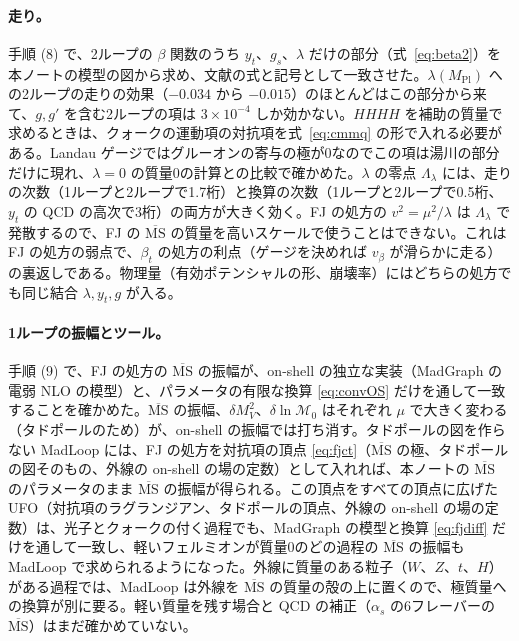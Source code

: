\documentclass[a4paper,10pt]{ltjsarticle}
\newcommand{\MSbar}{\overline{\mathrm{MS}}}
\begin{document}
\paragraph{走り。}手順 (8) で、2ループの $\beta$ 関数のうち $y_t$、$g_s$、$\lambda$ だけの部分（式~\eqref{eq:beta2}）を本ノートの模型の図から求め、文献の式と記号として一致させた。$\lambda(M_{\mathrm{Pl}})$ への2ループの走りの効果（$-0.034$ から $-0.015$）のほとんどはこの部分から来て、$g,g'$ を含む2ループの項は $3\times10^{-4}$ しか効かない。$HHHH$ を補助の質量で求めるときは、クォークの運動項の対抗項を式~\eqref{eq:cmmq} の形で入れる必要がある。Landau ゲージではグルーオンの寄与の極が0なのでこの項は湯川の部分だけに現れ、$\lambda=0$ の質量0の計算との比較で確かめた。$\lambda$ の零点 $\Lambda_\lambda$ には、走りの次数（1ループと2ループで1.7桁）と換算の次数（1ループと2ループで0.5桁、$y_t$ の QCD の高次で3桁）の両方が大きく効く。FJ の処方の $v^2=\mu^2/\lambda$ は $\Lambda_\lambda$ で発散するので、FJ の $\MSbar$ の質量を高いスケールで使うことはできない。これは FJ の処方の弱点で、$\beta_t$ の処方の利点（ゲージを決めれば $v_\beta$ が滑らかに走る）の裏返しである。物理量（有効ポテンシャルの形、崩壊率）にはどちらの処方でも同じ結合 $\lambda,y_t,g$ が入る。

\paragraph{1ループの振幅とツール。}手順 (9) で、FJ の処方の $\MSbar$ の振幅が、on-shell の独立な実装（MadGraph の電弱 NLO の模型）と、パラメータの有限な換算 \eqref{eq:convOS} だけを通して一致することを確かめた。$\MSbar$ の振幅、$\delta M_V^2$、$\delta\ln\mathcal M_0$ はそれぞれ $\mu$ で大きく変わる（タドポールのため）が、on-shell の振幅では打ち消す。タドポールの図を作らない MadLoop には、FJ の処方を対抗項の頂点 \eqref{eq:fjct}（$\MSbar$ の極、タドポールの図そのもの、外線の on-shell の場の定数）として入れれば、本ノートの $\MSbar$ のパラメータのまま $\MSbar$ の振幅が得られる。この頂点をすべての頂点に広げた UFO（対抗項のラグランジアン、タドポールの頂点、外線の on-shell の場の定数）は、光子とクォークの付く過程でも、MadGraph の模型と換算 \eqref{eq:fjdiff} だけを通して一致し、軽いフェルミオンが質量0のどの過程の $\MSbar$ の振幅も MadLoop で求められるようになった。外線に質量のある粒子（$W$、$Z$、$t$、$H$）がある過程では、MadLoop は外線を $\MSbar$ の質量の殻の上に置くので、極質量への換算が別に要る。軽い質量を残す場合と QCD の補正（$\alpha_s$ の6フレーバーの $\MSbar$）はまだ確かめていない。
\end{document}
